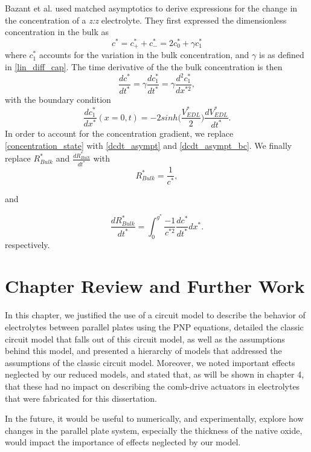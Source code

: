 Bazant et al. used matched asymptotics to derive expressions for the change in the concentration of a \textit{z:z} electrolyte. They first expressed the dimensionless concentration in the bulk as
\begin{equation} \label{concentration_asympt}
c^* = c_+^* + c_-^* = 2c_0^* + \gamma c_1^*
\end{equation}
where $c_1^*$ accounts for the variation in the bulk concentration, and $\gamma$ is as defined in \ref{lin_diff_cap}. The time derivative of the the bulk concentration is then
\begin{equation} \label{dcdt_asympt}
\frac{dc^*}{dt^*} = \gamma \frac{dc_1^*}{dt^*} = \gamma \frac{d^2c_1^*}{dx^{*2}},
\end{equation}
with the boundary condition
\begin{equation} \label{dcdt_asympt_bc}
\frac{dc_1^*}{dx^*}(x=0,t) = -2 sinh\bigg(\frac{V_{EDL}^*}{2}\bigg) \frac{dV_{EDL}^*}{dt^*}.
\end{equation}
In order to account for the concentration gradient, we replace \ref{concentration_state} with \ref{dcdt_asympt} and \ref{dcdt_asympt_bc}. We finally replace $R_{Bulk}^*$ and $\frac{dR_{Bulk}^*}{dt^*}$ with
\begin{equation}
R_{Bulk}^* = \frac{1}{c^*},
\end{equation}

and 

\begin{equation}
\frac{dR_{Bulk}^*}{dt^*} = \int_{0}^{g^*} \frac{-1}{c^{*2}}\frac{dc^*}{dt^*}dx^*.
\end{equation}
respectively.

\section{Chapter Review and Further Work}
In this chapter, we justified the use of a circuit model to describe the behavior of electrolytes between parallel plates using the PNP equations, detailed the classic circuit model that falls out of this circuit model, as well as the assumptions behind this model, and presented a hierarchy of models that addressed the assumptions of the classic circuit model. Moreover, we noted important effects neglected by our reduced models, and stated that, as will be shown in chapter 4, that these had no impact on describing the comb-drive actuators in electrolytes that were fabricated for this dissertation.

In the future, it would be useful to numerically, and experimentally, explore how changes in the parallel plate system, especially the thickness of the native oxide, would impact the importance of effects neglected by our model.